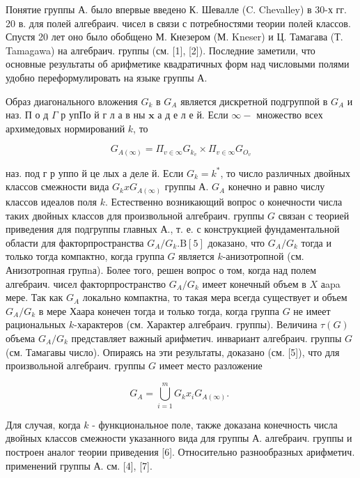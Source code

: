 \documentclass[10pt]{article}
\begin{document}
Понятие группы А. было впервые введено К. Шевалле (C. Chevalley) в 30-х гг. 20 в. для полей алгебраич. чисел в связи с потребностями теории полей классов. Спустя 20 лет оно было обобщено М. Кнезером (М. Kneser) и Ц. Тамагава (Т. Tamagawa) на алгебраич. группы (см. [1], [2]). Последние заметили, что основные результаты об арифметике квадратичных форм над числовыми полями удобно переформулировать на языке группы А.



Образ диагонального вложения $G_{k}$ в $G_{A}$ является дискретной подгруппой в $G_{A}$ и наз. П о д $\Gamma$ р упПо й г л а в ны $\mathbf{x}$ а д е л е й. Если $\infty-$ множество всех архимедовых нормирований $k$, то



\[

G_{A(\infty)}=\Pi_{v \in \infty} G_{k_{v}} \times \Pi_{v \in \infty} G_{O_{v}}

\]



наз. под г р уппо й це лых а деле й. Если $G_{k}=k^{*}$, то число различных двойных классов смежности вида $G_{k} x G_{A(\infty)}$ группы А. $G_{A}$ конечно и равно числу классов идеалов поля $k$. Естественно возникающий вопрос о конечности числа таких двойных классов для произвольной алгебраич. группы $G$ связан с теорией приведения для подгруппы главных А., т. е. с конструкцией фундаментальной области для факторпространства $G_{A} / G_{k} . \mathrm{B}[5]$ доказано, что $G_{A} / G_{k}$ тогда и только тогда компактно, когда группа $G$ является $k$-анизотропной (см. Анизотропная групnа). Более того, решен вопрос о том, когда над полем алгебраич. чисел факторпространство $G_{A} / G_{k}$ имеет конечный объем в $X$ аapa мере. Так как $G_{A}$ локально компактна, то такая мера всегда существует и объем $G_{A} / G_{k}$ в мере Хаара конечен тогда и только тогда, когда группа $G$ не имеет рациональных $k$-характеров (см. Характер алгебраич. группы). Величина $\tau(G)$ объема $G_{A} / G_{k}$ представляет важный арифметич. инвариант алгебраич. группы $G$ (см. Тамагавы число). Опираясь на эти результаты, доказано (см. [5]), что для произвольной алгебраич. группы $G$ имеет место разложение



\[

G_{A}=\bigcup_{i=1}^{m} G_{k} x_{i} G_{A(\infty)} \text {. }

\]



Для случая, когда $k$ - функциональное поле, также доказана конечность числа двойных классов смежности указанного вида для группы А. алгебраич. группы и построен аналог теории приведения [6]. Относительно разнообразных арифметич. применений группы А. см. [4], [7].
\end{document}
